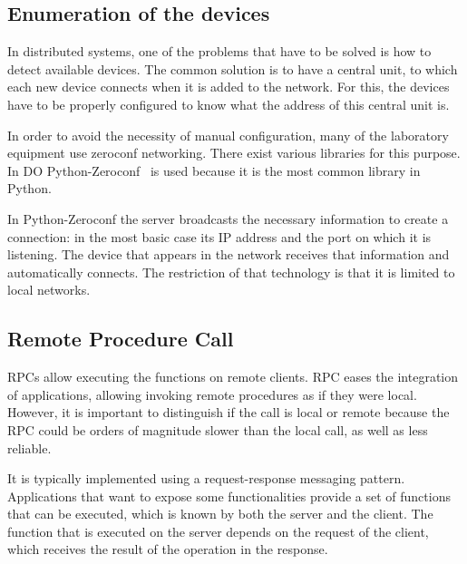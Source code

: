     \subsection{Enumeration of the devices} \label{subsec:zeroconf}
        In distributed systems, one of the problems that have to be solved is how to detect available devices. 
        The common solution is to have a central unit, to which each new device connects when it is added to the network. For this, the devices have to be properly configured to know what the address of this central unit is. 
        
        In order to avoid the necessity of manual configuration, many of the laboratory equipment use zeroconf networking. There exist various libraries for this purpose. In DO Python-Zeroconf~\cite{zeroconf} is used because it is the most common library in Python. 
        
        In Python-Zeroconf the server broadcasts the necessary information to create a connection: in the most basic case its IP address and the port on which it is listening. The device that appears in the network receives that information and automatically connects. The restriction of that technology is that it is limited to local networks.

    \subsection{Remote Procedure Call} \label{subsec:chap3:communication:rpc}
         RPCs allow executing the functions on remote clients. RPC eases the integration of applications, allowing invoking remote procedures as if they were local. However, it is important to distinguish if the call is local or remote because the RPC could be orders of magnitude slower than the local call, as well as less reliable. 
        
        It is typically implemented using a request-response messaging pattern. Applications that want to expose some functionalities provide a set of functions that can be executed, which is known by both the server and the client. The function that is executed on the server depends on the request of the client, which receives the result of the operation in the response.
        

